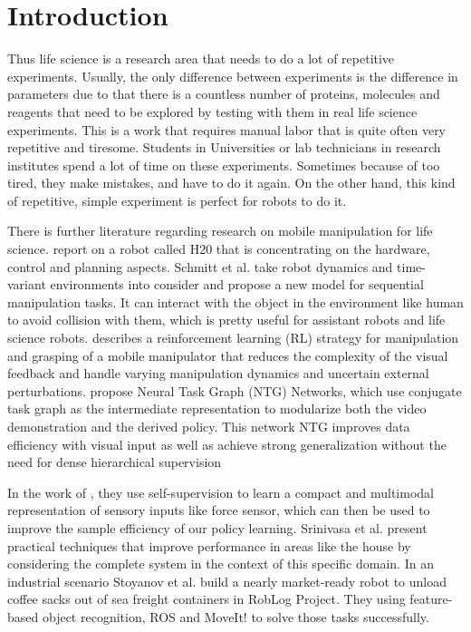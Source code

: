 \documentclass[12pt,draftclsnofoot,onecolumn]{IEEEtran}
\begin{document}
	
	\section{Introduction}
	Thus life science is a research area that needs to do a lot of repetitive experiments.
	Usually, the only difference between experiments is the difference in parameters due to that there is a countless number of proteins, molecules and reagents that need to be explored by testing with them in real life science experiments. 
	This is a work that requires manual labor that is quite often very repetitive and tiresome.
	Students in Universities or lab technicians in research institutes spend a lot of time on these experiments.
	Sometimes because of too tired, they make mistakes, and have to do it again.
	On the other hand, this kind of repetitive, simple experiment is perfect for robots to do it.
	
	There is further literature regarding research on mobile manipulation for life science. \cite{ali2016intelligent} report on a robot called H20 that is concentrating on the hardware, control and planning aspects.
	Schmitt et al.\cite{8793824} take robot dynamics and time-variant environments into consider and propose a new model for sequential manipulation tasks. It can interact with the object in the environment like human to avoid collision with them, which is pretty useful for assistant robots and life science robots.
	\cite{7953692}describes a reinforcement learning (RL) strategy for manipulation and grasping of a mobile manipulator that reduces the complexity of the visual feedback and handle varying manipulation dynamics and uncertain external perturbations.
	\cite{huang2019neural} propose Neural Task Graph (NTG) Networks, which use
	conjugate task graph as the intermediate representation to
	modularize both the video demonstration and the derived
	policy. This network NTG improves data efficiency with visual input as well as achieve strong generalization without the need for dense hierarchical supervision
	
	In the work of \cite{lee2018making}, they use self-supervision to learn a compact and multimodal representation of sensory inputs like force sensor, which can then be used to improve the sample efficiency of our policy learning.
	Srinivasa et al.\cite{srinivasa2016system}  present practical techniques that improve performance in areas like the house by considering the complete system in the context of this specific domain.
	In an industrial scenario Stoyanov et al.\cite{stoyanov2016no} build a nearly market-ready robot to unload coffee sacks out of sea freight containers in RobLog Project. They using feature-based object recognition, ROS and MoveIt! to solve those tasks successfully.
	
\end{document}

